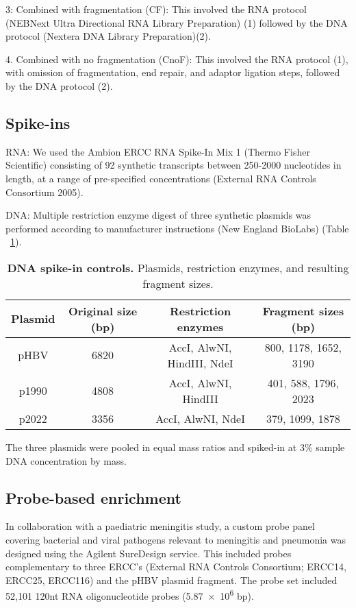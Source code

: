 3: Combined with fragmentation (CF): This involved the RNA protocol (NEBNext Ultra Directional RNA Library Preparation) (1) followed by the DNA protocol (Nextera DNA Library Preparation)(2).

4. Combined with no fragmentation (CnoF): This involved the RNA protocol (1), with omission of fragmentation, end repair, and adaptor ligation steps, followed by the DNA protocol (2). 

\subsection{Spike-ins}
RNA: We used the Ambion ERCC RNA Spike-In Mix 1 (Thermo Fisher Scientific) consisting of 92 synthetic transcripts between 250-2000 nucleotides in length, at a range of pre-specified concentrations (External RNA Controls Consortium 2005).

DNA: Multiple restriction enzyme digest of three synthetic plasmids was performed according to manufacturer instructions (New England BioLabs) (Table ~\ref{tab:plasmid}). 

\begin{table}[htbp]
\begin{center}
\begin{tabular}{|c|c|c|c|}
\hline
Plasmid & Original size (bp) & Restriction enzymes & Fragment sizes (bp)\\
\hline
pHBV & 6820 & AccI, AlwNI, HindIII, NdeI & 800, 1178, 1652, 3190\\
p1990 & 4808 & AccI, AlwNI, HindIII & 401, 588, 1796, 2023\\
p2022 & 3356 & AccI, AlwNI, NdeI & 379, 1099, 1878\\
\hline
\end{tabular}
\end{center}
\smallskip
\caption[DNA plasmid spike-in controls]{\textbf{DNA spike-in controls.} Plasmids, restriction enzymes, and resulting fragment sizes.}
\label{tab:plasmid}
\end{table}

The three plasmids were pooled in equal mass ratios and spiked-in at 3\% sample DNA concentration by mass.

\subsection{Probe-based enrichment}
In collaboration with a paediatric meningitis study, a custom probe panel covering bacterial and viral pathogens relevant to meningitis and pneumonia was designed using the Agilent SureDesign service. This included probes complementary to three ERCC's (External RNA Controls Consortium; ERCC14, ERCC25, ERCC116) and the pHBV plasmid fragment. The probe set included 52,101 120nt RNA oligonucleotide probes (\num{5.87e6} bp). 

